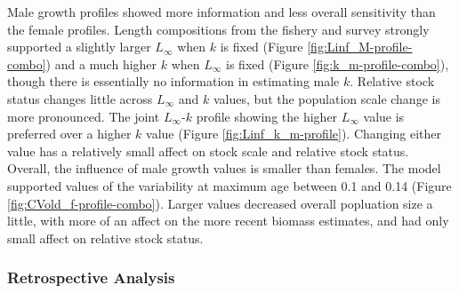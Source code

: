 \documentclass[11pt,
  english,
  a4paper,
]{article}
\begin{document}
\leavevmode\tagmcend\tagstructend\par


Male growth profiles showed more information and less overall sensitivity than the female profiles. Length compositions from the fishery and survey strongly supported a slightly larger {\(L_{\infty}\)\leavevmode\tagmcend\tagstructend} when {\(k\)\leavevmode\tagmcend\tagstructend} is fixed (Figure \ref{fig:Linf_M-profile-combo}) and a much higher {\(k\)\leavevmode\tagmcend\tagstructend} when {\(L_{\infty}\)\leavevmode\tagmcend\tagstructend} is fixed (Figure \ref{fig:k_m-profile-combo}), though there is essentially no information in estimating male {\(k\)\leavevmode\tagmcend\tagstructend}. Relative stock status changes little across {\(L_{\infty}\)\leavevmode\tagmcend\tagstructend} and {\(k\)\leavevmode\tagmcend\tagstructend} values, but the population scale change is more pronounced. The joint {\(L_{\infty}\)\leavevmode\tagmcend\tagstructend}-{\(k\)\leavevmode\tagmcend\tagstructend} profile showing the higher {\(L_{\infty}\)\leavevmode\tagmcend\tagstructend} value is preferred over a higher {\(k\)\leavevmode\tagmcend\tagstructend} value (Figure \ref{fig:Linf_k_m-profile}). Changing either value has a relatively small affect on stock scale and relative stock status. Overall, the influence of male growth values is smaller than females. The model supported values of the variability at maximum age between 0.1 and 0.14 (Figure \ref{fig:CVold_f-profile-combo}). Larger values decreased overall popluation size a little, with more of an affect on the more recent biomass estimates, and had only small affect on relative stock status.

\leavevmode\tagmcend\tagstructend\par


\hypertarget{retrospective-analysis}{%
\subsubsection{Retrospective Analysis}\label{retrospective-analysis}}
\end{document}
